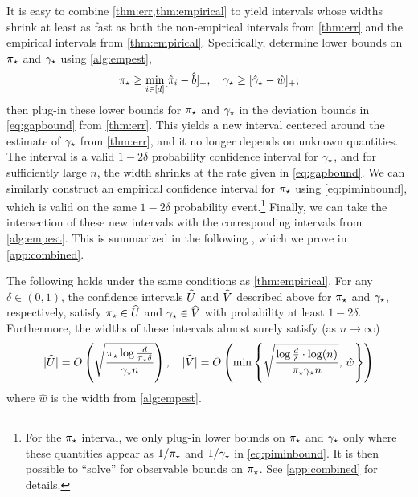 It is easy to combine \cref{thm:err,thm:empirical} to yield intervals
whose widths shrink at least as fast as both the non-empirical
intervals from \cref{thm:err} and the empirical intervals from
\cref{thm:empirical}.
Specifically, determine lower bounds on $\pi_{\star}$ and $\gamma_{\star}$ using
\cref{alg:empest},
\[
  \pi_{\star} \geq \min_{i \in [d]} [ \hat\pi_i - \hat{b} ]_+
  , \quad
  \gamma_{\star} \geq [ \hat\gamma_{\star} - \hat{w} ]_+
  ;
\]
then plug-in these lower bounds for $\pi_{\star}$ and $\gamma_{\star}$ in the
deviation bounds in \cref{eq:gapbound} from \cref{thm:err}.
This yields a new interval centered around the estimate of $\gamma_{\star}$ from
\cref{thm:err}, and it no longer depends on unknown quantities.
The interval is a valid $1-2\delta$ probability confidence interval
for $\gamma_{\star}$, and for sufficiently large $n$, the width shrinks at the
rate given in \cref{eq:gapbound}.
We can similarly construct an empirical confidence interval for
$\pi_{\star}$ using \cref{eq:piminbound}, which is valid on the same
$1-2\delta$ probability event.\footnote{%
  For the $\pi_{\star}$ interval, we only plug-in lower bounds on $\pi_{\star}$
  and $\gamma_{\star}$ only where these quantities appear as $1/\pi_{\star}$ and
  $1/\gamma_{\star}$ in \cref{eq:piminbound}.
  It is then possible to ``solve'' for observable bounds on $\pi_{\star}$.
  See \cref{app:combined} for details.%
}
Finally, we can take the intersection of these new intervals with the
corresponding intervals from \cref{alg:empest}.
This is summarized in the following , which
we prove in \cref{app:combined}.
\begin{theorem}
  \label{thm:combined}
  The following holds under the same conditions as
  \cref{thm:empirical}.
  For any $\delta \in (0,1)$, the confidence intervals $\widehat{U}$ and
  $\widehat{V}$ described above for $\pi_{\star}$ and $\gamma_{\star}$, respectively,
  satisfy $\pi_{\star} \in \widehat{U}$ and $\gamma_{\star} \in \widehat{V}$ with probability
  at least $1-2\delta$.
  Furthermore, the widths of these intervals almost surely satisfy
  (as $n \to \infty$) 
  \[
    |\widehat{U}|
    =
    O\left(
      \sqrt{\frac{\pi_{\star}\log\frac{d}{\pi_{\star}\delta}}{\gamma_{\star} n}}
    \right)
    ,
    \quad
    |\widehat{V}|
    =
    O\left(
      \min\left\{
        \sqrt{\frac{\log\frac{d}{\delta}\cdot\log(n)}{\pi_{\star}\gamma_{\star} n}}
        ,\,
        \hat{w}
      \right\}
    \right)
  \]
  where $\hat{w}$ is the width from \cref{alg:empest}.
\end{theorem}


